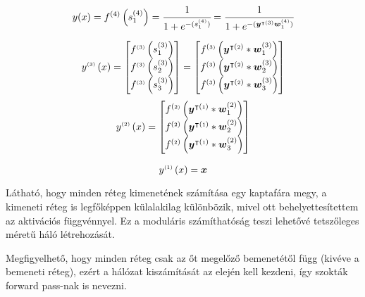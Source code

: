 \begin{equation}
    y(x) = f^{(4)}\left(s^{(4)}_1\right) = \cfrac{1}{1+e^{-(s^{(4)}_1)}} = \cfrac{1}{1+e^{-(\boldsymbol y^{\intercal {\scriptscriptstyle(3)}}\boldsymbol w^{{\scriptscriptstyle(4)}}_1)}}
\end{equation}

\begin{equation}
    y^{{\scriptscriptstyle(3)}}\left(x\right) =
    \begin{bmatrix}
    f^{{\scriptscriptstyle(3)}}\left(s^{(3)}_1\right) \\
    f^{{\scriptscriptstyle(3)}}\left(s^{(3)}_2\right) \\
    f^{{\scriptscriptstyle(3)}}\left(s^{(3)}_3\right)
    \end{bmatrix}
     = 
    \begin{bmatrix}
    f^{({\scriptscriptstyle3)}}\left(\boldsymbol y^{\intercal({\scriptscriptstyle2})}*\boldsymbol w^{(3)}_1\right) \\
    f^{({\scriptscriptstyle3})}\left(\boldsymbol y^{\intercal({\scriptscriptstyle2})}*\boldsymbol w^{(3)}_2\right) \\
    f^{({\scriptscriptstyle3})}\left(\boldsymbol y^{\intercal({\scriptscriptstyle2})}*\boldsymbol w^{(3)}_3\right)
    \end{bmatrix}
    \label{outputlayer}
\end{equation}
\begin{equation}
    y^{{\scriptscriptstyle(2)}}\left(x\right) =
    \begin{bmatrix}
    f^{({\scriptscriptstyle2)}}\left(\boldsymbol y^{\intercal({\scriptscriptstyle1})}*\boldsymbol w^{(2)}_1\right) \\
    f^{({\scriptscriptstyle2})}\left(\boldsymbol y^{\intercal({\scriptscriptstyle1})}*\boldsymbol w^{(2)}_2\right) \\
    f^{({\scriptscriptstyle2})}\left(\boldsymbol y^{\intercal({\scriptscriptstyle1})}*\boldsymbol w^{(2)}_3\right)
    \end{bmatrix}
\end{equation}

\begin{equation}
    y^{{\scriptscriptstyle(1)}}\left(x\right) = \boldsymbol x
\end{equation}


Látható, hogy minden réteg kimenetének számítása egy kaptafára megy, a kimeneti réteg is legfőképpen külalakilag különbözik, mivel ott behelyettesítettem az aktivációs függvénnyel. Ez a moduláris számíthatóság teszi lehetővé tetszőleges méretű háló létrehozását.

Megfigyelhető, hogy minden réteg csak az őt megelőző bemenetétől függ (kivéve a bemeneti réteg), ezért a hálózat kiszámítását az elején kell kezdeni, így szokták \foreignlanguage{english}{forward pass}-nak is nevezni.

